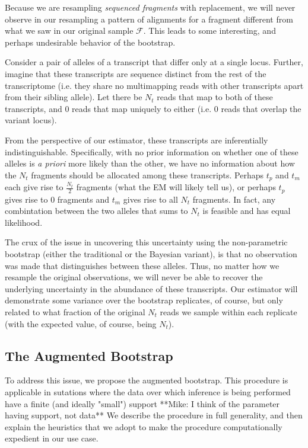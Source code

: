 Because we are resampling \textit{sequenced fragments} with replacement, we will never observe in our 
resampling a pattern of alignments for a fragment different from what we saw in our original sample 
$\mathcal{F}$. This leads to some interesting, and perhaps undesirable behavior of the bootstrap. 

Consider a pair of alleles of a transcript that differ only at a single locus.  Further, imagine 
that these transcripts are sequence distinct from the rest of the transcriptome (i.e. they share no 
multimapping reads with other transcripts apart from their sibling allele).  Let there be $N_t$ 
reads that map to both of these transcripts, and $0$ reads that map uniquely to either (i.e. 0 
reads that overlap the variant locus).

From the perspective of our estimator, these transcripts are inferentially indistinguishable.  
Specifically, with no prior information on whether one of these alleles is \textit{a priori} more likely 
than the other, we have no information about how the $N_t$ fragments should be allocated among 
these transcripts.  Perhaps $t_p$ and $t_m$ each give rise to $\frac{N_t}{2}$ fragments (what the 
EM will likely tell us), or perhaps $t_p$ gives rise to 0 fragments and $t_m$ gives rise to all 
$N_t$ fragments.  In fact, any combintation between the two alleles that sums to $N_t$ is feasible 
and has equal likelihood.

The crux of the issue in uncovering this uncertainty using the non-parametric bootstrap (either the 
traditional or the Bayesian variant), is that no observation was made that distinguishes between 
these alleles.  Thus, no matter how we resample the original observations, we will never be able 
to recover the underlying uncertainty in the abundance of these transcripts.  Our estimator will 
demonstrate some variance over the bootstrap replicates, of course, but only related to what 
fraction of the original $N_t$ reads we sample within each replicate (with the expected value, 
of course, being $N_t$).

\subsection{The Augmented Bootstrap}

To address this issue, we propose the augmented bootstrap.  This procedure is applicable in 
sutations where the data over which inference is being performed have a finite (and ideally "small") 
support **Mike: I think of the parameter having support, not data**  We describe the procedure in 
full generality, and then explain the heuristics that we adopt to make the procedure computationally 
expedient in our use case.

